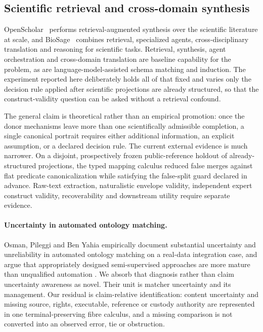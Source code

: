 \subsection{Scientific retrieval and cross-domain synthesis}

OpenScholar~\cite{openScholar2024} performs retrieval-augmented synthesis
over the scientific literature at scale, and BioSage~\cite{biosage2025} combines
retrieval, specialized agents, cross-disciplinary translation and reasoning
for scientific tasks. Retrieval, synthesis, agent orchestration and
cross-domain translation are baseline capability for the problem, as are
language-model-assisted schema matching and induction. The experiment reported
here deliberately holds all of that fixed and varies only the decision rule
applied after scientific projections are already structured, so that the
construct-validity question can be asked without a retrieval confound.

The general claim is theoretical rather than an empirical promotion: once the
donor mechanisms leave more than one scientifically admissible completion, a
single canonical portrait requires either additional information, an explicit
assumption, or a declared decision rule. The current external evidence is much
narrower. On a disjoint, prospectively frozen public-reference holdout of
already-structured projections, the typed mapping calculus reduced false
merges against flat predicate canonicalization while satisfying the
false-split guard declared in advance. Raw-text extraction, naturalistic
envelope validity, independent expert construct validity, recoverability and
downstream utility require separate evidence.
\paragraph{Uncertainty in automated ontology matching.}
Osman, Pileggi and Ben Yahia empirically document substantial uncertainty and
unreliability in automated ontology matching on a real-data integration case,
and argue that appropriately designed semi-supervised approaches are more
mature than unqualified automation \cite{osman2024uncertainty}. We absorb that
diagnosis rather than claim uncertainty awareness as novel. Their unit is
matcher uncertainty and its management. Our residual is claim-relative
identification: content uncertainty and missing source, rights, executable,
reference or custody authority are represented in one terminal-preserving
fibre calculus, and a missing comparison is not converted into an observed
error, tie or obstruction.

\endinput
